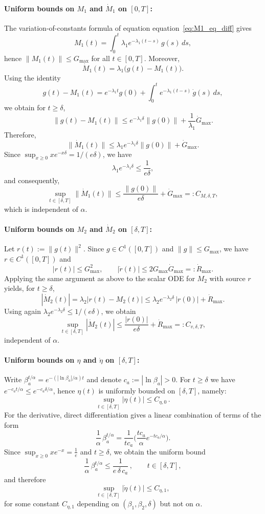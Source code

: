\documentclass{article} %
\def\eqref#1{equation~\ref{#1}}
\begin{document}
\paragraph{Uniform bounds on $M_1$ and $\dot M_1$ on $[0,T]$:}
The variation-of-constants formula of equation \eqref{eq:M1_eq_diff} gives
\[
M_1(t)=\int_0^t \lambda_1 e^{-\lambda_1(t-s)}\,g(s)\,ds,
\]
hence $\|M_1(t)\|\le G_{\max}$ for all $t\in[0,T]$.
Moreover,
\[
\dot M_1(t)=\lambda_1\big(g(t)-M_1(t)\big).
\]
Using the identity
\[
g(t)-M_1(t)=e^{-\lambda_1 t}g(0)+\int_0^t e^{-\lambda_1(t-s)}\,\dot g(s)\,ds,
\]
we obtain for $t\ge \delta$,
\[
\|g(t)-M_1(t)\|
\le e^{-\lambda_1\delta}\|g(0)\|+\frac{1}{\lambda_1}\dot G_{\max}.
\]
Therefore,
\[
\|\dot M_1(t)\|
\le \lambda_1 e^{-\lambda_1\delta}\|g(0)\|+\dot G_{\max}.
\]
Since $\sup_{x\ge 0} x e^{-x\delta}=1/(e\delta)$, we have
\[
\lambda_1 e^{-\lambda_1\delta}\le \frac{1}{e\delta},
\]
and consequently,
\begin{equation}\label{eq:M1dot-bound-app}
\sup_{t\in[\delta,T]}\|\dot M_1(t)\|
\le \frac{\|g(0)\|}{e\delta}+\dot G_{\max}
=:C_{M,\delta,T},
\end{equation}
which is independent of $\alpha$.

\paragraph{Uniform bounds on $M_2$ and $\dot M_2$ on $[\delta,T]$:}
Let $r(t):=\|g(t)\|^2$. Since $g\in C^1([0,T])$ and $\|g\|\le G_{\max}$, we have
$r\in C^1([0,T])$ and
\[
|r(t)|\le G_{\max}^2,\qquad |\dot r(t)|\le 2G_{\max}\dot G_{\max}=: \dot R_{\max}.
\]
Applying the same argument as above to the scalar ODE for $M_2$ with source $r$
yields, for $t\ge\delta$,
\[
|\dot M_2(t)|
=\lambda_2|r(t)-M_2(t)|
\le \lambda_2 e^{-\lambda_2\delta}\,|r(0)|+\dot R_{\max}.
\]
Using again $\lambda_2 e^{-\lambda_2\delta}\le 1/(e\delta)$, we obtain
\begin{equation}\label{eq:vdot-bound-app}
\sup_{t\in[\delta,T]}|\dot M_2(t)|
\le \frac{|r(0)|}{e\delta}+\dot R_{\max}
=:C_{v,\delta,T},
\end{equation}
independent of $\alpha$.

\paragraph{Uniform bounds on $\eta$ and $\dot\eta$ on $[\delta,T]$:}
Write $\beta_a^{t/\alpha}=e^{-(|\ln\beta_a|/\alpha)t}$ and denote $c_a:=|\ln\beta_a|>0$. For $t\ge\delta$ we have $e^{-c_a t/\alpha}\le e^{-c_a\delta/\alpha}$, hence $\eta(t)$ is uniformly bounded on $[\delta,T]$, namely:
\[
\sup_{t\in[\delta,T]}|\eta(t)|\le C_{\eta,0}\,.
\]
For the derivative, direct differentiation gives a linear combination of terms of the form
\[
\frac{1}{\alpha}\,\beta_a^{t/\alpha}
=\frac{1}{tc_a}\Big(\frac{t c_a}{\alpha}e^{-t c_a/\alpha}\Big).
\]
Since $\sup_{x\ge 0}x e^{-x}=\frac{1}{e}$ and $t\ge\delta$, we obtain the uniform bound
\[
\frac{1}{\alpha}\,\beta_a^{t/\alpha}\le \frac{1}{e\,\delta\,c_a}\,,\qquad t\in[\delta,T],
\]
and therefore
\[
\sup_{t\in[\delta,T]}|\dot\eta(t)|\le C_{\eta,1},
\]
for some constant $C_{\eta,1}$ depending on $(\beta_1,\beta_2,\delta)$ but not on $\alpha$.
\end{document}
